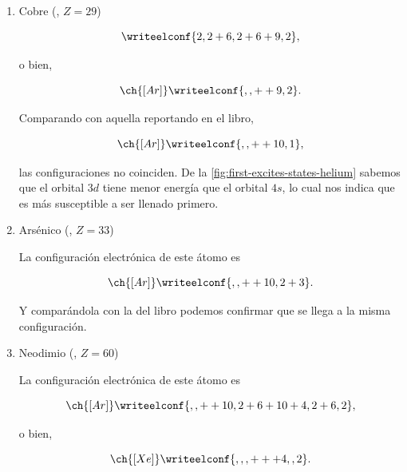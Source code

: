 \documentclass[./../main.tex]{subfiles}
\begin{document}
\begin{exercise}
\begin{solution}
            \begin{enumerate}
                \item Cobre (, \(Z = 29\))
                
                \begin{equation*}
                    \writeelconf{2,2+6,2+6+9,2},
                \end{equation*}

                o bien,

                \begin{equation*}
                    \ch{[Ar]}\writeelconf{,,++9,2}.
                \end{equation*}

                Comparando con aquella reportando en el libro,

                \begin{equation*}
                    \ch{[Ar]}\writeelconf{,,++10,1},
                \end{equation*}

                \idest las configuraciones no coinciden. De la \cref{fig:first-excites-states-helium} sabemos que el orbital \(3d\) tiene menor energía que el orbital \(4s\), lo cual nos indica que es más susceptible a ser llenado primero.

                \item Arsénico (, \(Z = 33\))
                
                La configuración electrónica de este átomo es

                \begin{equation*}
                    \ch{[Ar]}\writeelconf{,,++10,2+3}.
                \end{equation*}

                Y comparándola con la del libro podemos confirmar que se llega a la misma configuración.

                \item Neodimio (, \(Z = 60\))
                
                La configuración electrónica de este átomo es

                \begin{equation*}
                    \ch{[Ar]}\writeelconf{,,++10,2+6+10+4,2+6,2},
                \end{equation*}

                o bien,

                \begin{equation*}
                    \ch{[Xe]}\writeelconf{,,,+++4,,2}.
                \end{equation*}


\end{enumerate}
\end{solution}
\end{exercise}
\end{document}
